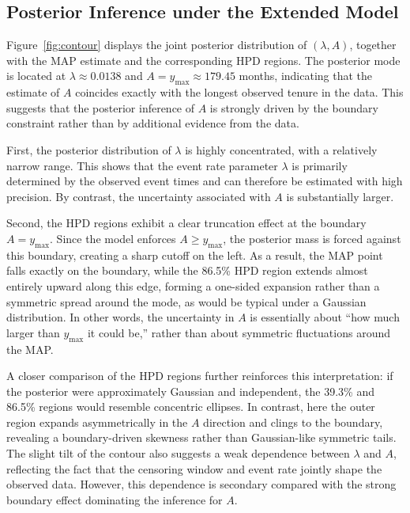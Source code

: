 \subsection{Posterior Inference under the Extended Model}
\label{res:post_contour}
Figure~\ref{fig:contour} displays the joint posterior distribution of $(\lambda, A)$, together with the MAP estimate and the corresponding HPD regions. The posterior mode is located at $\lambda \approx 0.0138$ and $A = y_{\max} \approx 179.45$ months, indicating that the estimate of $A$ coincides exactly with the longest observed tenure in the data. This suggests that the posterior inference of $A$ is strongly driven by the boundary constraint rather than by additional evidence from the data.

First, the posterior distribution of $\lambda$ is highly concentrated, with a relatively narrow range. This shows that the event rate parameter $\lambda$ is primarily determined by the observed event times and can therefore be estimated with high precision. By contrast, the uncertainty associated with $A$ is substantially larger.

Second, the HPD regions exhibit a clear truncation effect at the boundary $A = y_{\max}$. Since the model enforces $A \geq y_{\max}$, the posterior mass is forced against this boundary, creating a sharp cutoff on the left. As a result, the MAP point falls exactly on the boundary, while the 86.5\% HPD region extends almost entirely upward along this edge, forming a one-sided expansion rather than a symmetric spread around the mode, as would be typical under a Gaussian distribution. In other words, the uncertainty in $A$ is essentially about “how much larger than $y_{\max}$ it could be,” rather than about symmetric fluctuations around the MAP.

A closer comparison of the HPD regions further reinforces this interpretation: if the posterior were approximately Gaussian and independent, the 39.3\% and 86.5\% regions would resemble concentric ellipses. In contrast, here the outer region expands asymmetrically in the $A$ direction and clings to the boundary, revealing a boundary-driven skewness rather than Gaussian-like symmetric tails. The slight tilt of the contour also suggests a weak dependence between $\lambda$ and $A$, reflecting the fact that the censoring window and event rate jointly shape the observed data. However, this dependence is secondary compared with the strong boundary effect dominating the inference for $A$.

